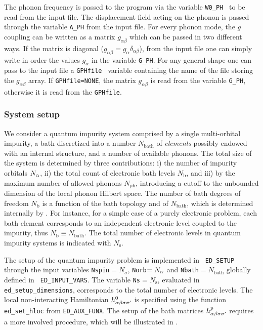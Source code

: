 \documentclass[edipack_sp.tex]{subfiles}
\begin{document}
The phonon frequency is passed to the \NAME program via the variable { \tt W0\_PH } to be read from the input file. The displacement field acting on the phonon is passed through the variable {\tt A\_PH} from the input file. For every phonon mode, the $g$ coupling can be written as a matrix $g_{\alpha \beta}$ which can be passed in two different ways. If the matrix is diagonal ($g_{\alpha \beta} = g_\alpha \delta_{\alpha \beta}$), from the input file one can simply write in order the values $g_\alpha$ in the variable {\tt G\_PH}. For any general shape one can pass to the input file a {\tt GPHfile } variable containing the name of the file storing the $g_{\alpha \beta}$ array.
If {\tt GPHfile=NONE}, the matrix $g_{\alpha\beta}$ is read from the variable {\tt G\_PH}, otherwise it is read from the {\tt GPHfile}.

\subsubsection{System setup}
We consider a quantum impurity system comprised by a single multi-orbital impurity, a bath discretized into a number $N_\mathrm{bath}$ of {\it elements} possibly endowed with an internal structure, and a number of available phonons. 
The total size of the system is determined by three contributions: i) the number of impurity orbitals $N_\alpha$, ii) the total count of electronic bath levels $N_\mathrm{b}$, and iii) by the maximum  number of allowed phonons $N_\mathrm{ph}$, introducing a cutoff to the unbounded dimension of the local phonon Hilbert space.
The number of bath degrees of freedom $N_\mathrm{b}$ is a
function of the bath topology and of $N_\mathrm{bath}$, which is determined internally by \NAME.
For instance, for a simple case of a purely electronic problem, each bath
element corresponds to an independent electronic level coupled to the
impurity, thus $N_\mathrm{b}\equiv N_\mathrm{bath}$. 
The total number of electronic levels in quantum impurity systems is indicated with $N_\mathrm{s}$.


The setup of the quantum impurity problem is implemented in {\tt
  ED\_SETUP} through the input variables {\tt Nspin}$=N_\sigma$,
{\tt Norb}$=N_\alpha$ and {\tt Nbath}$=N_\mathrm{bath}$ globally defined in {\tt
  ED\_INPUT\_VARS}. The variable {\tt Ns}$=N_\mathrm{s}$, evaluated in
{\tt ed\_setup\_dimensions}, corresponds to the total number of
electronic levels. 
The local non-interacting Hamiltonian
$h^0_{\alpha\beta\sigma\sigma'}$ is specified using the function {\tt ed\_set\_hloc} from {\tt ED\_AUX\_FUNX}.
The setup of the bath matrices $h^p_{\alpha\beta\sigma\sigma'}$
requires a more involved procedure, which will be illustrated in
. 
\end{document}
